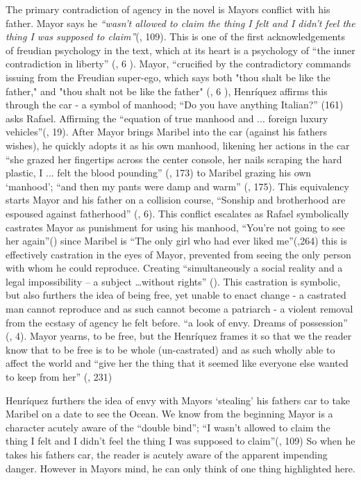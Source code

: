 \documentclass{article}
\begin{document}
The primary contradiction of agency in the novel is Mayors conflict with his father. Mayor says he 
\textit{``wasn’t allowed to claim the thing I felt and I didn’t feel the thing I was supposed to claim''}(\cite{Henriquez2014-sh}, 109). This is one of the first acknowledgements of freudian psychology in the text, which at its heart is a psychology of ``the inner contradiction in liberty'' (\cite{loves-bdy}, 6 ).
Mayor, ``crucified by the contradictory commands issuing from the Freudian super-ego, which says both "thou shalt be like the father," and "thou shalt not be like the father" (\cite{loves-bdy}, 6 ), Henríquez affirms this through the car - a symbol of manhood; ``Do you have anything Italian?'' (161) asks Rafael. Affirming the ``equation of  true manhood and ... foreign luxury vehicles''(\cite{Uhlman2015-qx}, 19). After Mayor brings Maribel into the car (against his fathers wishes), he quickly adopts it as his own manhood, likening her actions in the car ``she grazed her fingertips across the center console, her nails scraping the hard plastic, I ... felt the blood pounding'' (\cite{Henriquez2014-sh}, 173) to Maribel grazing his own `manhood'; ``and then my pants were damp and warm'' (\cite{Henriquez2014-sh}, 175). This equivalency starts Mayor and his father on a collision course, ``Sonship and brotherhood are espoused against fatherhood'' (\cite{loves-bdy}, 6). This conflict escalates as Rafael symbolically castrates Mayor as punishment for using his manhood, ``You're not going to see her again''(\cite{Henriquez2014-sh}) since Maribel is ``The only girl who had ever liked me''(\cite{Henriquez2014-sh},264) this is effectively castration in the eyes of Mayor, prevented from seeing the only person with whom he could reproduce.  Creating  ``simultaneously a social reality and a legal impossibility – a subject \dots without rights'' (\cite{Lutes_Travis_2021}). This castration is symbolic, but also furthers the idea of being free, yet unable to enact change - a castrated man cannot reproduce and as such cannot become a patriarch - a violent removal from the ecstasy of agency he felt before. ``a look of envy. Dreams of possession'' (\cite{wretched}, 4). Mayor yearns, to be free, but the Henríquez frames it so that we the reader know that to be free is to be whole (un-castrated) and as such wholly able to affect the world and ``give her the thing that it seemed like everyone else wanted to keep from her'' (\cite{Henriquez2014-sh}, 231) 

Henríquez furthers the idea of envy with Mayors `stealing' his fathers car to take Maribel on a date to see the Ocean. We know from the beginning Mayor is a character acutely aware of the ``double bind''; ``I wasn’t allowed to claim the thing I felt and I didn’t feel the thing I was supposed to claim''(\cite{Henriquez2014-sh}, 109)  So when he takes his fathers car, the reader is acutely aware of the apparent impending danger. However in Mayors mind, he can only think of one thing highlighted here.
\end{document}

